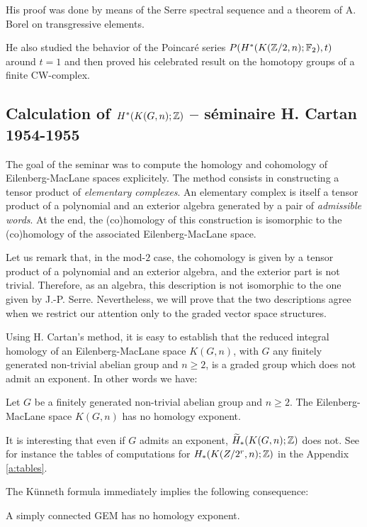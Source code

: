 His proof was done by means of the Serre spectral sequence and a theorem of A. Borel \cite{Bo53} on transgressive elements.

He also studied the behavior of the Poincar\'e series $P(H^*(K(\mathbb{Z}/2,n);\mathbb{F}_2),t)$ around $t=1$ and then proved his celebrated result on the homotopy groups of a finite CW-complex.

\subsection*{Calculation of $H^*(K(G,n);\mathbb{Z})$ -- s\'eminaire H. Cartan 1954-1955}
The goal of the seminar \cite{Ca55} was to compute the homology and cohomology of Eilenberg-MacLane spaces explicitely. The method consists in constructing a tensor product of {\it elementary complexes}. An elementary complex is itself a tensor product of a polynomial and an exterior algebra generated by a pair of {\it admissible words}. At the end, the (co)homology of this construction is isomorphic to the (co)homology of the associated Eilenberg-MacLane space.

Let us remark that, in the mod-$2$ case, the cohomology is given by a tensor product of a polynomial and an exterior algebra, and the exterior part is not trivial. Therefore, as an algebra, this description is not isomorphic to the one given by J.-P. Serre. Nevertheless, we will prove that the two descriptions agree when we restrict our attention only to the graded vector space structures.

Using H. Cartan's method, it is easy to establish that the reduced integral homology of an Eilenberg-MacLane space $K(G,n)$, with $G$ any finitely generated non-trivial abelian group and $n\geq2$, is a graded group which does not admit an exponent. In other words we have:

\begin{thm*}
Let $G$ be a finitely generated non-trivial abelian group and $n\geq2$. The Eilenberg-MacLane space $K(G,n)$ has no homology exponent.
\end{thm*}
It is interesting that even if $G$ admits an exponent, $\widetilde{H}_*(K(G,n);\mathbb{Z})$ does not. See for instance the tables of computations for $H_*(K(Z/2^r,n);\mathbb{Z})$ in the Appendix \ref{a:tables}. 

\newpage
The K\"unneth formula immediately implies the following consequence:
\begin{cor*}
A  simply connected GEM has no homology exponent.
\end{cor*}

